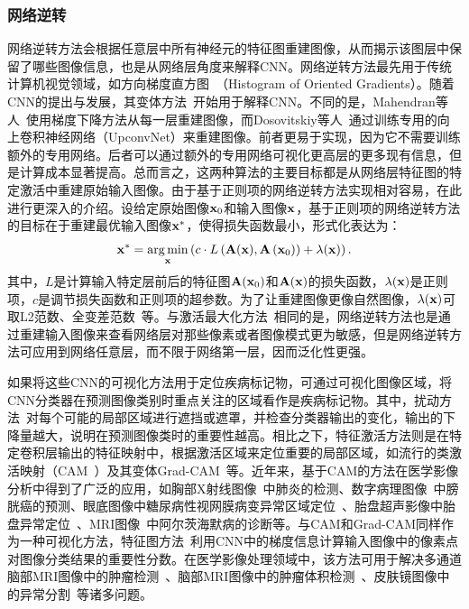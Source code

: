 \subsubsection*{网络逆转}
网络逆转方法会根据任意层中所有神经元的特征图重建图像，从而揭示该图层中保留了哪些图像信息，也是从网络层角度来解释CNN。网络逆转方法最先用于传统计算机视觉领域，如方向梯度直方图~\cite{dalal2005histograms}（Histogram of Oriented Gradients）。随着CNN的提出与发展，其变体方法~\cite{mahendran2015understanding, mahendran2016visualizing, dosovitskiy2016inverting}开始用于解释CNN。不同的是，Mahendran等人~\cite{mahendran2015understanding, mahendran2016visualizing}使用梯度下降方法从每一层重建图像，而Dosovitskiy等人~\cite{dosovitskiy2016inverting}通过训练专用的向上卷积神经网络（UpconvNet）来重建图像。前者更易于实现，因为它不需要训练额外的专用网络。后者可以通过额外的专用网络可视化更高层的更多现有信息，但是计算成本显著提高。总而言之，这两种算法的主要目标都是从网络层特征图的特定激活中重建原始输入图像。由于基于正则项的网络逆转方法实现相对容易，在此进行更深入的介绍。设给定原始图像$\mathbf{x}_0$和输入图像$\mathbf{x}$，基于正则项的网络逆转方法的目标在于重建最优输入图像$\mathbf{x}^*$，使得损失函数最小，形式化表达为：
\begin{equation}
\mathbf{x}^{*}=\underset{\mathbf{x}}{\operatorname{arg\, min}}\left(c \cdot {L}\left(\mathbf{A}(\mathbf{x}), \mathbf{A}\left(\mathbf{x}_{0}\right)\right)+\lambda(\mathbf{x})\right).
\end{equation}
其中，${L}$是计算输入特定层前后的特征图$\mathbf{A}(\mathbf{x}_0)$和$\mathbf{A}(\mathbf{x})$的损失函数，$\lambda(\mathbf{x})$是正则项，$c$是调节损失函数和正则项的超参数。为了让重建图像更像自然图像，$\lambda(\mathbf{x})$可取L2范数、全变差范数~\cite{rudin1992nonlinear}等。与激活最大化方法~\cite{simonyan2013deep}相同的是，网络逆转方法也是通过重建输入图像来查看网络层对那些像素或者图像模式更为敏感，但是网络逆转方法可应用到网络任意层，而不限于网络第一层，因而泛化性更强。

如果将这些CNN的可视化方法用于定位疾病标记物，可通过可视化图像区域，将CNN分类器在预测图像类别时重点关注的区域看作是疾病标记物。其中，扰动方法~\cite{zintgraf2017visualizing}对每个可能的局部区域进行遮挡或遮罩，并检查分类器输出的变化，输出的下降量越大，说明在预测图像类时的重要性越高。相比之下，特征激活方法则是在特定卷积层输出的特征映射中，根据激活区域来定位重要的局部区域，如流行的类激活映射（CAM~\cite{zhou2016learning}）及其变体Grad-CAM~\cite{selvaraju2017grad}等。近年来，基于CAM的方法在医学影像分析中得到了广泛的应用，如胸部X射线图像~\cite{rajpurkar2017chexnet}中肺炎的检测、数字病理图像~\cite{zhang2017mdnet}中膀胱癌的预测、眼底图像中糖尿病性视网膜病变异常区域定位~\cite{Gondaletal17}、胎盘超声影像中胎盘异常定位~\cite{Qi2017WeaklySL}、MRI图像~\cite{yang2018visual}中阿尔茨海默病的诊断等。与CAM和Grad-CAM同样作为一种可视化方法，特征图方法~\cite{simonyan2013deep}利用CNN中的梯度信息计算输入图像中的像素点对图像分类结果的重要性分数。在医学影像处理领域中，该方法可用于解决多通道脑部MRI图像中的肿瘤检测~\cite{banerjee2016novel}、脑部MRI图像中的肿瘤体积检测~\cite{mitra2017volumetric}、皮肤镜图像中的异常分割~\cite{jahanifar2018supervised}等诸多问题。

